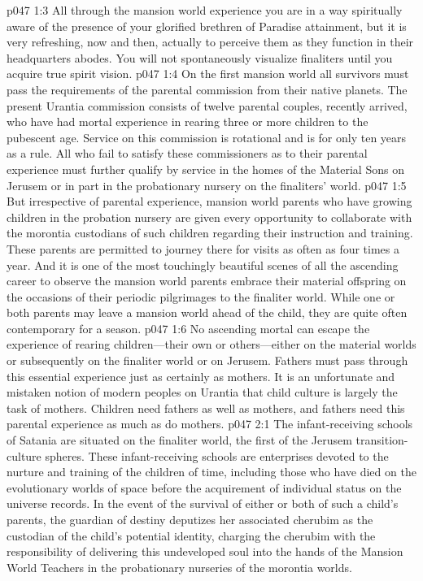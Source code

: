 \vs p047 1:3 All through the mansion world experience you are in a way spiritually aware of the presence of your glorified brethren of Paradise attainment, but it is very refreshing, now and then, actually to perceive them as they function in their headquarters abodes. You will not spontaneously visualize finaliters until you acquire true spirit vision.
\pc \vs p047 1:4 On the first mansion world all survivors must pass the requirements of the parental commission from their native planets. The present Urantia commission consists of twelve parental couples, recently arrived, who have had mortal experience in rearing three or more children to the pubescent age. Service on this commission is rotational and is for only ten years as a rule. All who fail to satisfy these commissioners as to their parental experience must further qualify by service in the homes of the Material Sons on Jerusem or in part in the probationary nursery on the finaliters’ world.
\vs p047 1:5 But irrespective of parental experience, mansion world parents who have growing children in the probation nursery are given every opportunity to collaborate with the morontia custodians of such children regarding their instruction and training. These parents are permitted to journey there for visits as often as four times a year. And it is one of the most touchingly beautiful scenes of all the ascending career to observe the mansion world parents embrace their material offspring on the occasions of their periodic pilgrimages to the finaliter world. While one or both parents may leave a mansion world ahead of the child, they are quite often contemporary for a season.
\vs p047 1:6 No ascending mortal can escape the experience of rearing children---their own or others---either on the material worlds or subsequently on the finaliter world or on Jerusem. Fathers must pass through this essential experience just as certainly as mothers. It is an unfortunate and mistaken notion of modern peoples on Urantia that child culture is largely the task of mothers. Children need fathers as well as mothers, and fathers need this parental experience as much as do mothers.
\vs p047 2:1 The infant\hyp{}receiving schools of Satania are situated on the finaliter world, the first of the Jerusem transition\hyp{}culture spheres. These infant\hyp{}receiving schools are enterprises devoted to the nurture and training of the children of time, including those who have died on the evolutionary worlds of space before the acquirement of individual status on the universe records. In the event of the survival of either or both of such a child’s parents, the guardian of destiny deputizes her associated cherubim as the custodian of the child’s potential identity, charging the cherubim with the responsibility of delivering this undeveloped soul into the hands of the Mansion World Teachers in the probationary nurseries of the morontia worlds.
